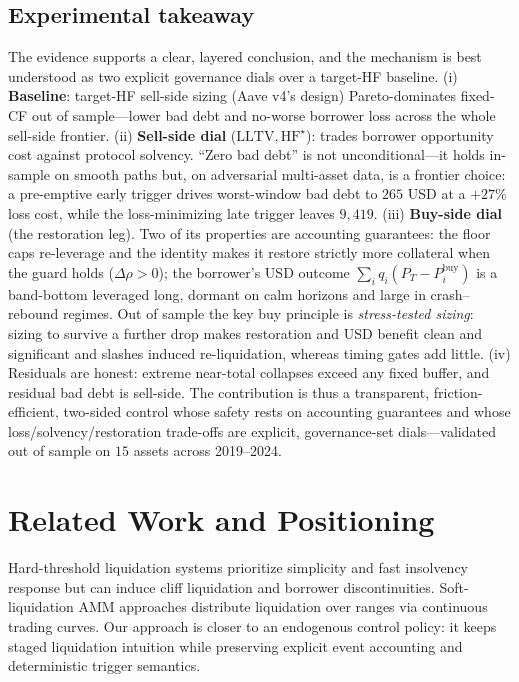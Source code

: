 \documentclass[12pt]{article}
\begin{document}
\subsection{Experimental takeaway}
The evidence supports a clear, layered conclusion, and the mechanism is best understood as two explicit governance dials over a target-HF baseline. (i) \textbf{Baseline}: target-HF sell-side sizing (Aave v4's design) Pareto-dominates fixed-CF out of sample---lower bad debt and no-worse borrower loss across the whole sell-side frontier. (ii) \textbf{Sell-side dial} ($\mathrm{LLTV},\mathrm{HF}^{\star}$): trades borrower opportunity cost against protocol solvency. ``Zero bad debt'' is not unconditional---it holds in-sample on smooth paths but, on adversarial multi-asset data, is a frontier choice: a pre-emptive early trigger drives worst-window bad debt to $265$ USD at a ${+}27\%$ loss cost, while the loss-minimizing late trigger leaves $9{,}419$. (iii) \textbf{Buy-side dial} (the restoration leg). Two of its properties are accounting guarantees: the floor caps re-leverage and the identity makes it restore strictly more collateral when the guard holds ($\Delta\rho>0$); the borrower's USD outcome $\sum_i q_i(P_T-P_i^{\text{buy}})$ is a band-bottom leveraged long, dormant on calm horizons and large in crash--rebound regimes. Out of sample the key buy principle is \emph{stress-tested sizing}: sizing to survive a further drop makes restoration and USD benefit clean and significant and slashes induced re-liquidation, whereas timing gates add little. (iv) Residuals are honest: extreme near-total collapses exceed any fixed buffer, and residual bad debt is sell-side. The contribution is thus a transparent, friction-efficient, two-sided control whose safety rests on accounting guarantees and whose loss/solvency/restoration trade-offs are explicit, governance-set dials---validated out of sample on $15$ assets across 2019--2024.

\section{Related Work and Positioning}
Hard-threshold liquidation systems prioritize simplicity and fast insolvency response but can induce cliff liquidation and borrower discontinuities. Soft-liquidation AMM approaches distribute liquidation over ranges via continuous trading curves. Our approach is closer to an endogenous control policy: it keeps staged liquidation intuition while preserving explicit event accounting and deterministic trigger semantics.
\end{document}
